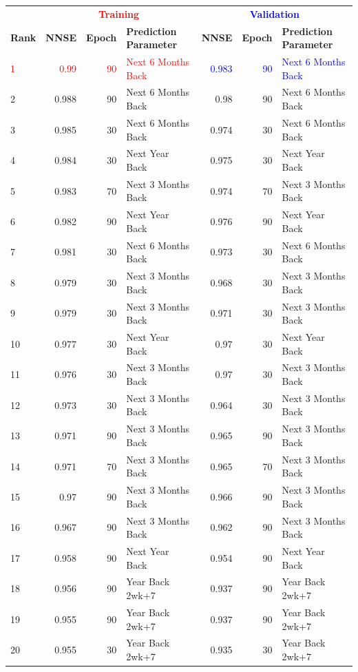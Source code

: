 \documentclass[utf8]{FrontiersinVancouver} %
\begin{document}
\begin{table}[htb]
      \renewcommand{\arraystretch}{1.2}
      \begin{center}
        {\footnotesize
    \begin{tabular}{|l||r|r|l|r|r|l|}
      \hline
     &   \multicolumn{3}{c|}{\bf \textcolor{red}{Training}}  & \multicolumn{3}{c|}{\bf \textcolor{blue}{Validation}}  \\
    {\bf Rank} &  {\bf NNSE} &  {\bf Epoch} & {\bf Prediction Parameter} & {\bf NNSE} &  {\bf Epoch} & {\bf Prediction Parameter}\\
    \hline
    \hline
        \textcolor{red}{1}  &  \textcolor{red}{0.99} &     \textcolor{red}{90} &  \textcolor{red}{Next 6 Months Back} &  \textcolor{blue}{0.983} &     \textcolor{blue}{90} &  \textcolor{blue}{Next 6 Months Back} \\
    2  &  0.988 &     90 &  Next 6 Months Back &  0.98 &     90 &  Next 6 Months Back \\
3  &  0.985 &     30 &  Next 6 Months Back &  0.974 &     30 &  Next 6 Months Back \\
4  &  0.984 &     30 &      Next Year Back &  0.975 &     30 &      Next Year Back \\
5  &  0.983 &     70 &  Next 3 Months Back &  0.974 &     70 &  Next 3 Months Back \\
6  &  0.982 &     90 &      Next Year Back &  0.976 &     90 &      Next Year Back \\
7  &  0.981 &     30 &  Next 6 Months Back &  0.973 &     30 &  Next 6 Months Back \\
8  &  0.979 &     30 &  Next 3 Months Back &  0.968 &     30 &  Next 3 Months Back \\
9  &  0.979 &     30 &  Next 3 Months Back &  0.971 &     30 &  Next 3 Months Back \\
10  &  0.977 &     30 &      Next Year Back &  0.97 &     30 &      Next Year Back \\
11  &  0.976 &     30 &  Next 3 Months Back &  0.97 &     30 &  Next 3 Months Back \\
12  &  0.973 &     30 &  Next 3 Months Back &  0.964 &     30 &  Next 3 Months Back \\
13  &  0.971 &     90 &  Next 3 Months Back &  0.965 &     90 &  Next 3 Months Back \\
14  &  0.971 &     70 &  Next 3 Months Back &  0.965 &     70 &  Next 3 Months Back \\
15  &  0.97 &     90 &  Next 3 Months Back &  0.966 &     90 &  Next 3 Months Back \\
16  &  0.967 &     90 &  Next 3 Months Back &  0.962 &     90 &  Next 3 Months Back \\
17  &  0.958 &     90 &      Next Year Back &  0.954 &     90 &      Next Year Back \\
18  &  0.956 &     90 &     Year Back 2wk+7 &  0.937 &     90 &     Year Back 2wk+7 \\
19  &  0.955 &     90 &     Year Back 2wk+7 &  0.937 &     90 &     Year Back 2wk+7 \\
20  &  0.955 &     30 &     Year Back 2wk+7 &  0.935 &     30 &     Year Back 2wk+7 \\


\end{tabular}}
\end{center}
\end{table}
\end{document}
